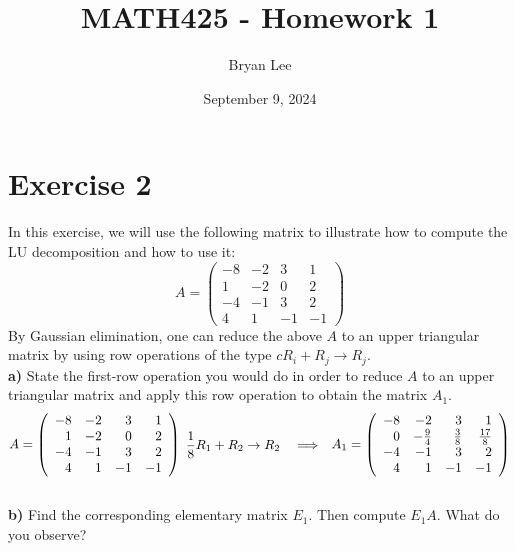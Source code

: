 \documentclass{article}
\title{MATH425 - Homework 1}
\author{Bryan Lee}
\date{September 9, 2024}
\begin{document}
\maketitle

\section*{Exercise 2}
In this exercise, we will use the following matrix to illustrate how to compute the LU decomposition
and how to use it:
$$ A = \left( \begin{array}{rrrr} -8 & -2 & 3 & 1 \\ 1 & -2 & 0 & 2 \\ -4 & -1 &
3 & 2 \\ 4 & 1 & -1 & -1 \end{array} \right)$$
By Gaussian elimination, one can reduce the above $A$ to an upper triangular matrix
by using row operations of the type $cR_i + R_j \rightarrow R_j$. \\
{\bf a)} State the first-row operation you would do in order to reduce $A$ to an
upper triangular matrix and apply this row operation to
obtain the matrix $A_1$.\\

\[
A = 
\left(
\begin{array}{rrrr}
-8 & -2 & 3 & 1 \\
1 & -2 & 0 & 2 \\
-4 & -1 & 3 & 2 \\
4 & 1 & -1 & -1 
\end{array}
\right)
\hspace{0.1cm}
\begin{aligned}
& \frac{1}{8}R_1 + R_2 \rightarrow R_2 \quad\Longrightarrow
\end{aligned}
A_1 =
\left(
\begin{array}{rrrr}
-8 & -2 & 3 & 1 \\
0 & -\frac{9}{4} & \frac{3}{8} & \frac{17}{8} \\
-4 & -1 & 3 & 2 \\
4 & 1 & -1 & -1 
\end{array}
\right)
\]\\

{\bf b)} Find the corresponding elementary matrix $E_1$. Then compute $E_1A$. What
do you observe? \\
\end{document}

